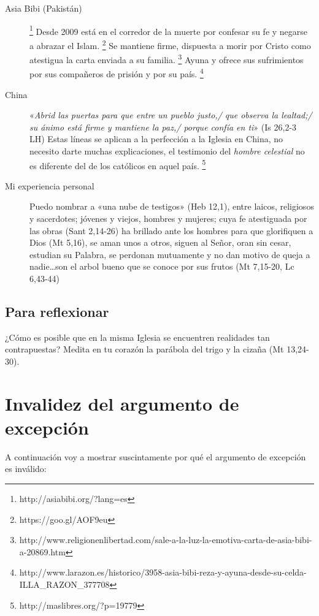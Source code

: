 \documentclass{article}
\begin{document}
\begin{description}
\item[Asia Bibi (Pakistán)]%
        \footnote{http://asiabibi.org/?lang=es}
    Desde 2009 está en el corredor de la muerte por confesar su fe y negarse a abrazar el Islam.%
        \footnote{https://goo.gl/AOF9eu}
    Se mantiene firme, dispuesta a morir por Cristo como atestigua la carta enviada a su familia.%
        \footnote{http://www.religionenlibertad.com/sale-a-la-luz-la-emotiva-carta-de-asia-bibi-a-20869.htm}
    Ayuna y ofrece sus sufrimientos por sus compañeros de prisión y por su país.%
        \footnote{http://www.larazon.es/historico/3958-asia-bibi-reza-y-ayuna-desde-su-celda-ILLA\_RAZON\_377708}

\item[China]
    «\emph{Abrid las puertas para que entre un pueblo justo,/
    que observa la lealtad;/
    su ánimo está firme y mantiene la paz,/
    porque confía en ti}» (Is 26,2-3 LH) Estas líneas se aplican a la perfección a la Iglesia en China, no necesito darte muchas explicaciones, el testimonio del \emph{hombre celestial} no es diferente del de los católicos en aquel país.%
        \footnote{http://maslibres.org/?p=19779}
    
\item[Mi experiencia personal]
    Puedo nombrar a «una nube de testigos» (Heb 12,1), entre laicos, religiosos y sacerdotes; jóvenes y viejos, hombres y mujeres; cuya fe atestiguada por las obras (Sant 2,14-26) ha brillado ante los hombres para que glorifiquen a Dios (Mt 5,16), se aman unos a otros, siguen al Señor, oran sin cesar, estudian su Palabra, se perdonan mutuamente y no dan motivo de queja a nadie\ldots son el arbol bueno que se conoce por sus frutos (Mt 7,15-20, Lc 6,43-44)
\end{description}

\subsection{Para reflexionar}

¿Cómo es posible que en la misma Iglesia se encuentren realidades tan contrapuestas? Medita en tu coraz\'on la par\'abola del trigo y la ciza\~na (Mt 13,24-30).

\section{Invalidez del argumento de excepci\'on}

A continuaci\'on voy a mostrar suscintamente por qu\'e el argumento de excepci\'on es inv\'alido:
\end{document}
